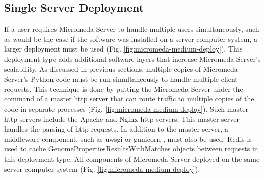 \subsection{Single Server Deployment} \label{single-server-micromeda-deployment}

If a user requires Micromeda-Server to handle multiple users simultaneously, 
such as would be the case if the software was installed on a server computer 
system, a larger deployment must be used (Fig. 
\ref{fig:micromeda-medium-deploy}). This deployment type adds additional 
software layers that increase Micromeda-Server's scalability. As discussed in 
previous sections, multiple copies of Micromeda-Server's Python code must be run 
simultaneously to handle multiple client requests. This technique is done by 
putting the Micromeda-Server under the command of a master \gls{http} server 
that can route traffic to multiple copies of the code in separate processes (Fig. 
\ref{fig:micromeda-medium-deploy}). Such master \gls{http} servers include the 
Apache \cite{fielding1997apache} and Nginx \cite{reese2008nginx} \gls{http} 
servers. This master server handles the parsing of \gls{http} requests. In 
addition to the master server, a middleware component, such as \gls{uwsgi} 
\cite{2019uwsgi} or gunicorn \cite{chesneau_2018}, must also be used. Redis is 
used to cache GenomePropertiesResultsWithMatches objects between requests in 
this deployment type. All components of Micromeda-Server deployed on the 
same server computer system (Fig. \ref{fig:micromeda-medium-deploy}).

